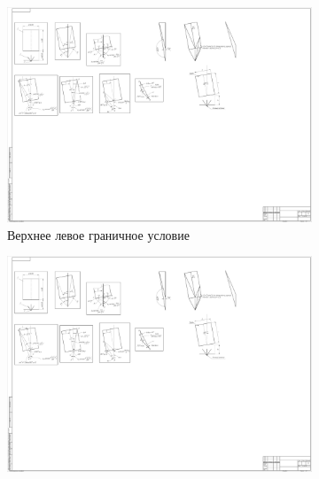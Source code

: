 \documentclass[../AISTR.tex]{subfiles}
\begin{document}
\begin{figure}[p]
	\begin{subfigure}{0.5\linewidth}
		\centering
		\includegraphics[trim=100 1200 2820 760, clip, height=1.1\linewidth]{../images/schemes}
		\caption{Верхнее левое граничное условие}
		\label{fig:verh_left}
	\end{subfigure}
	\begin{subfigure}{0.5\linewidth}
		\centering
		\includegraphics[trim=600 1220 2430 790, clip, height=1.1\linewidth]{../images/schemes}

\end{subfigure}
\end{figure}
\end{document}
